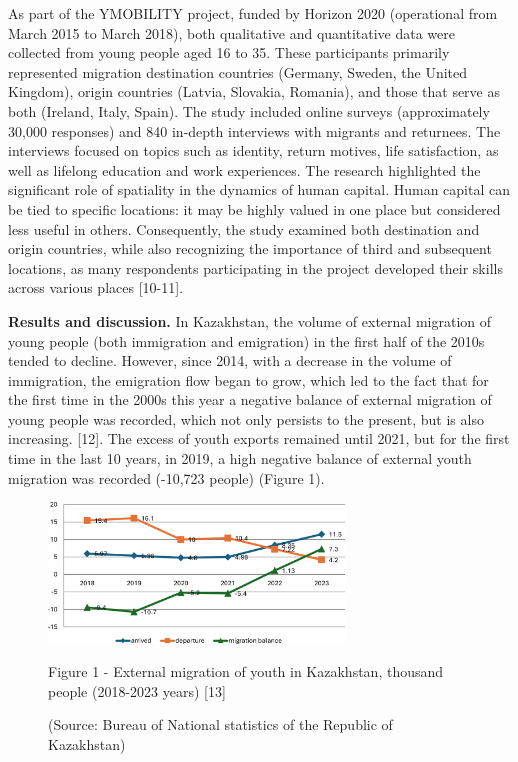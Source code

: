 \begin{multicols}{2}
As part of the YMOBILITY project, funded by Horizon 2020 (operational
from March 2015 to March 2018), both qualitative and quantitative data
were collected from young people aged 16 to 35. These participants
primarily represented migration destination countries (Germany, Sweden,
the United Kingdom), origin countries (Latvia, Slovakia, Romania), and
those that serve as both (Ireland, Italy, Spain). The study included
online surveys (approximately 30,000 responses) and 840 in-depth
interviews with migrants and returnees. The interviews focused on topics
such as identity, return motives, life satisfaction, as well as lifelong
education and work experiences. The research highlighted the significant
role of spatiality in the dynamics of human capital. Human capital can
be tied to specific locations: it may be highly valued in one place but
considered less useful in others. Consequently, the study examined both
destination and origin countries, while also recognizing the importance
of third and subsequent locations, as many respondents participating in
the project developed their skills across various places {[}10-11{]}.

{\bfseries Results and discussion.} In Kazakhstan, the volume of external
migration of young people (both immigration and emigration) in the first
half of the 2010s tended to decline. However, since 2014, with a
decrease in the volume of immigration, the emigration flow began to
grow, which led to the fact that for the first time in the 2000s this
year a negative balance of external migration of young people was
recorded, which not only persists to the present, but is also
increasing. {[}12{]}. The excess of youth exports remained until 2021,
but for the first time in the last 10 years, in 2019, a high negative
balance of external youth migration was recorded (-10,723 people)
(Figure 1).
\end{multicols}

\begin{figure}[H]
	\centering
	\includegraphics[width=0.7\textwidth]{media/ekon/Graph_4}
	\caption*{Figure 1 - External migration of youth in Kazakhstan, thousand people (2018-2023 years) {[}13{]}}
	\caption*{(Source: Bureau of National statistics of the Republic of Kazakhstan)}
\end{figure}

